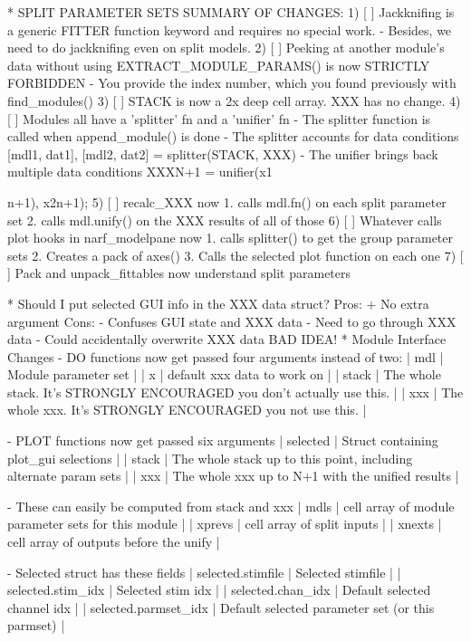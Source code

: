 * SPLIT PARAMETER SETS
 SUMMARY OF CHANGES:
  1) [ ] Jackknifing is a generic FITTER function keyword and requires no special work.
         - Besides, we need to do jackknifing even on split models.
  2) [ ] Peeking at another module's data without using EXTRACT_MODULE_PARAMS() is now STRICTLY FORBIDDEN
         - You provide the index number, which you found previously with find_modules()
  3) [ ] STACK is now a 2x deep cell array. XXX has no change.
  4) [ ] Modules all have a 'splitter' fn and a 'unifier' fn
	 - The splitter function is called when append_module() is done
	 - The splitter accounts for data conditions
	   {[mdl1, dat1], [mdl2, dat2]} = splitter(STACK, XXX)
	 - The unifier brings back multiple data conditions
	   XXX{N+1} = unifier(x1{n+1), x2{n+1});
  5) [ ] recalc_XXX now 
	   1. calls mdl.fn() on each split parameter set
	   2. calls mdl.unify() on the XXX results of all of those
  6) [ ] Whatever calls plot hooks in narf_modelpane now
	   1. calls splitter() to get the group parameter sets
	   2. Creates a pack of axes()
	   3. Calls the selected plot function on each one
  7) [ ] Pack and unpack_fittables now understand split parameters

* Should I put selected GUI info  in the XXX data struct?
    Pros:
    + No extra argument    
    Cons:
    - Confuses GUI state and XXX data
    - Need to go through XXX data  
    - Could accidentally overwrite XXX data
    BAD IDEA!
* Module Interface Changes
  - DO functions now get passed four arguments instead of two:
    | mdl   | Module parameter set                                                   |
    | x     | default xxx data to work on                                            |
    | stack | The whole stack. It's STRONGLY ENCOURAGED you don't actually use this. |
    | xxx   | The whole xxx. It's STRONGLY ENCOURAGED you not use this.              |

  - PLOT functions now get passed six arguments
    | selected | Struct containing plot_gui selections                            |
    | stack    | The whole stack up to this point, including alternate param sets |
    | xxx      | The whole xxx up to N+1 with the unified results                 |

  - These can easily be computed from stack and xxx
    | mdls   | cell array of module parameter sets for this module |
    | xprevs | cell array of split inputs                          |
    | xnexts | cell array of outputs before the unify              |
 
  - Selected struct has these fields
    | selected.stimfile    | Selected stimfile              |
    | selected.stim_idx    | Selected stim idx              |
    | selected.chan_idx    | Default selected channel idx   |
    | selected.parmset_idx | Default selected parameter set (or this parmset) |

}
